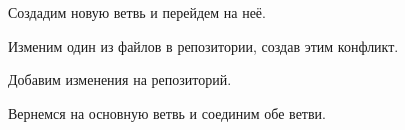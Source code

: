 \hfill
\begin{figure}[h!]
	\caption{Создадим новую ветвь и перейдем на неё.}
	\label{ris:image}
\end{figure}
\hfill
\begin{figure}[h]
	\caption{Изменим один из файлов в репозитории, создав этим конфликт.}
	\label{ris:image}
\end{figure}
\hfill
\begin{figure}[h]
	\caption{Добавим изменения на репозиторий.}
	\label{ris:image}
\end{figure}
\hfill
\begin{figure}[h]
	\caption{Вернемся на основную ветвь и соединим обе ветви.}
	\label{ris:image}
\end{figure}
\hfill
